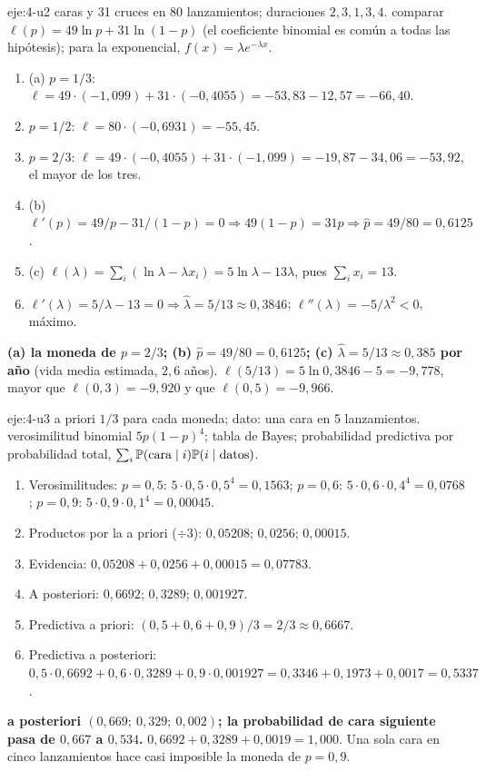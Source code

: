 \begin{solucion}{eje:4-u2}
 caras y 31 cruces en 80 lanzamientos; duraciones $2,3,1,3,4$.
\planteamiento comparar $\ell(p)=49\ln p+31\ln(1-p)$ (el coeficiente binomial es común a todas las hipótesis); para la exponencial, $f(x)=\lambda e^{-\lambda x}$.
\pasos
\begin{enumerate}[label=\arabic*.]
  \item (a) $p=1/3$: $\ell=49\cdot(-1{,}099)+31\cdot(-0{,}4055)=-53{,}83-12{,}57=-66{,}40$.
  \item $p=1/2$: $\ell=80\cdot(-0{,}6931)=-55{,}45$.
  \item $p=2/3$: $\ell=49\cdot(-0{,}4055)+31\cdot(-1{,}099)=-19{,}87-34{,}06=-53{,}92$, el mayor de los tres.
  \item (b) $\ell'(p)=49/p-31/(1-p)=0\Rightarrow 49(1-p)=31p\Rightarrow\hat p=49/80=0{,}6125$.
  \item (c) $\ell(\lambda)=\sum_i(\ln\lambda-\lambda x_i)=5\ln\lambda-13\lambda$, pues $\sum_i x_i=13$.
  \item $\ell'(\lambda)=5/\lambda-13=0\Rightarrow\hat\lambda=5/13\approx 0{,}3846$; $\ell''(\lambda)=-5/\lambda^{2}<0$, máximo.
\end{enumerate}
\resultado \textbf{(a) la moneda de $p=2/3$; (b) $\hat p=49/80=0{,}6125$; (c) $\hat\lambda=5/13\approx 0{,}385$ por año} (vida media estimada, $2{,}6$ años).
\comprobacion $\ell(5/13)=5\ln 0{,}3846-5=-9{,}778$, mayor que $\ell(0{,}3)=-9{,}920$ y que $\ell(0{,}5)=-9{,}966$.
\end{solucion}

\begin{solucion}{eje:4-u3}
\datos a priori $1/3$ para cada moneda; dato: una cara en 5 lanzamientos.
\planteamiento verosimilitud binomial $5p(1-p)^{4}$; tabla de Bayes; probabilidad predictiva por probabilidad total, $\sum_i\mathbb{P}(\text{cara}\mid i)\mathbb{P}(i\mid\text{datos})$.
\pasos
\begin{enumerate}[label=\arabic*.]
  \item Verosimilitudes: $p=0{,}5$: $5\cdot 0{,}5\cdot 0{,}5^{4}=0{,}1563$; $p=0{,}6$: $5\cdot 0{,}6\cdot 0{,}4^{4}=0{,}0768$; $p=0{,}9$: $5\cdot 0{,}9\cdot 0{,}1^{4}=0{,}00045$.
  \item Productos por la a priori ($\div 3$): $0{,}05208$; $0{,}0256$; $0{,}00015$.
  \item Evidencia: $0{,}05208+0{,}0256+0{,}00015=0{,}07783$.
  \item A posteriori: $0{,}6692$; $0{,}3289$; $0{,}001927$.
  \item Predictiva a priori: $(0{,}5+0{,}6+0{,}9)/3=2/3\approx 0{,}6667$.
  \item Predictiva a posteriori: $0{,}5\cdot 0{,}6692+0{,}6\cdot 0{,}3289+0{,}9\cdot 0{,}001927=0{,}3346+0{,}1973+0{,}0017=0{,}5337$.
\end{enumerate}
\resultado \textbf{a posteriori $(0{,}669;\ 0{,}329;\ 0{,}002)$; la probabilidad de cara siguiente pasa de $0{,}667$ a $0{,}534$.}
\comprobacion $0{,}6692+0{,}3289+0{,}0019=1{,}000$. Una sola cara en cinco lanzamientos hace casi imposible la moneda de $p=0{,}9$.
\end{solucion}

